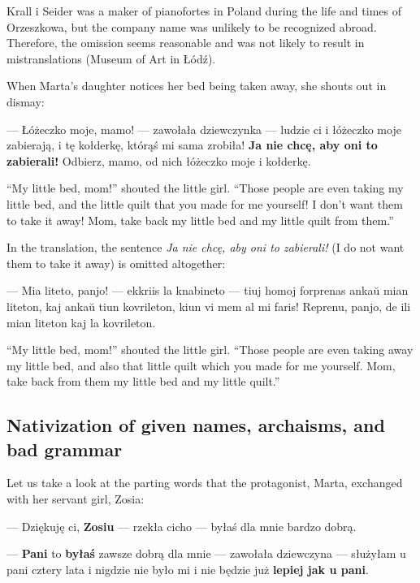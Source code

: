 Krall i Seider was a maker of pianofortes in Poland during the life and times of Orzeszkowa, but the company name was unlikely to be recognized abroad.
Therefore, the omission seems reasonable and was not likely to result in mistranslations (Museum of Art in Łódź).

When Marta's daughter notices her bed being taken away, she shouts out in dismay:

\begin{displayquote}
--- Łóżeczko moje, mamo! --- zawołała dziewczynka --- ludzie ci i łóżeczko moje zabierają, i tę kołderkę, którąś mi sama zrobiła! \textbf{Ja nie chcę, aby oni to zabierali!} Odbierz, mamo, od nich łóżeczko moje i kołderkę.
\end{displayquote}

``My little bed, mom!'' shouted the little girl. ``Those people are even taking my little bed, and the little quilt that you made for me yourself! I don't want them to take it away! Mom, take back my little bed and my little quilt from them.''

In the translation, the sentence \textit{Ja nie chcę, aby oni to zabierali!} (I do not want them to take it away) is omitted altogether:

\begin{displayquote}
--- Mia liteto, panjo! --- ekkriis la knabineto --- tiuj homoj forprenas ankaŭ mian liteton, kaj ankaŭ tiun kovrileton, kiun vi mem al mi faris! Reprenu, panjo, de ili mian liteton kaj la kovrileton.
\end{displayquote}

``My little bed, mom!'' shouted the little girl. ``Those people are even taking away my little bed, and also that little quilt which you made for me yourself. Mom, take back from them my little bed and my little quilt.''

\subsection{Nativization of given names, archaisms, and bad grammar}

Let us take a look at the parting words that the protagonist, Marta, exchanged with her servant girl, Zosia:

\begin{displayquote}
--- Dziękuję ci, \textbf{Zosiu} --- rzekła cicho --- byłaś dla mnie bardzo dobrą.

--- \textbf{Pani} to \textbf{byłaś} zawsze dobrą dla mnie --- zawołała dziewczyna --- służyłam u pani cztery lata i nigdzie nie było mi i nie będzie już \textbf{lepiej jak u pani}.
\end{displayquote}


